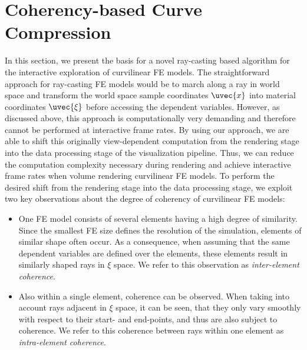 \documentclass[review,journal]{vgtc}         %
\begin{document}
\section{Coherency-based Curve Compression}\label{sec:preprocessing}

In this section, we present the basis for a novel ray-casting based algorithm for the interactive exploration of curvilinear FE models. The straightforward approach for ray-casting FE models would be to march along a ray in world space and transform the world space sample coordinates $\uvec{x}$ into material coordinates $\uvec{\xi}$ before accessing the dependent variables. However, as discussed above, this approach is computationally very demanding and therefore cannot be performed at interactive frame rates. By using our approach, we are able to shift this originally view-dependent computation from the rendering stage into the data processing stage of the visualization pipeline. Thus, we can reduce the computation complexity necessary during rendering and achieve interactive frame rates when volume rendering curvilinear FE models. To perform the desired shift from the rendering stage into the data processing stage, we exploit two key observations about the degree of coherency of curvilinear FE models:

\begin{itemize}
\item One FE model consists of several elements having a high degree of similarity. Since the smallest FE size defines the resolution of the simulation, elements of similar shape often occur. As a consequence, when assuming that the same dependent variables are defined over the elements, these elements result in similarly shaped rays in $\xi$ space. We refer to this observation as \emph{inter-element coherence}.
\item Also within a single element, coherence can be observed. When taking into account rays adjacent in $\xi$ space, it can be seen, that they only vary smoothly with respect to their start- and end-points, and thus are also subject to coherence. We refer to this coherence between rays within one element as \emph{intra-element coherence}.
\end{itemize}
\end{document}
